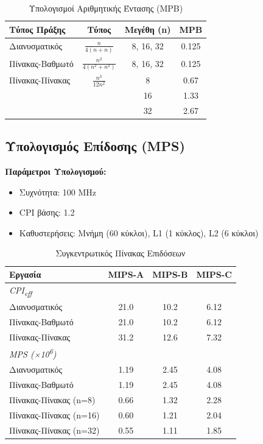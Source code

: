 \documentclass[11pt,a4paper]{article}
\begin{document}
\begin{table}[H]
\centering
\begin{tabular}{|l|c|c|c|}
\hline
\textbf{Τύπος Πράξης} & \textbf{Τύπος} & \textbf{Μεγέθη (n)} & \textbf{MPB} \\
\hline
Διανυσματικός & $\frac{n}{4(n + n)}$ & 8, 16, 32 & 0.125 \\
\hline
Πίνακας-Βαθμωτό & $\frac{n^2}{4(n^2 + n^2)}$ & 8, 16, 32 & 0.125 \\
\hline
Πίνακας-Πίνακας & $\frac{n^3}{12n^2}$ & 8 & 0.67 \\
& & 16 & 1.33 \\
& & 32 & 2.67 \\
\hline
\end{tabular}
\caption{Υπολογισμοί Αριθμητικής Έντασης (MPB)}
\label{tab:mpb-calcs}
\end{table}

\subsection{Υπολογισμός Επίδοσης (MPS)}

\textbf{Παράμετροι Υπολογισμού:}
\begin{itemize}
\item Συχνότητα: 100 MHz
\item CPI βάσης: 1.2
\item Καθυστερήσεις: Μνήμη (60 κύκλοι), L1 (1 κύκλος), L2 (6 κύκλοι)
\end{itemize}

\begin{table}[H]
\centering
\begin{tabular}{|l|c|c|c|}
\hline
\textbf{Εργασία} & \textbf{MIPS-A} & \textbf{MIPS-B} & \textbf{MIPS-C} \\
\hline
\multicolumn{4}{|l|}{\textit{CPI\textsubscript{eff}}} \\
\hline
Διανυσματικός & 21.0 & 10.2 & 6.12 \\
Πίνακας-Βαθμωτό & 21.0 & 10.2 & 6.12 \\
Πίνακας-Πίνακας & 31.2 & 12.6 & 7.32 \\
\hline
\multicolumn{4}{|l|}{\textit{MPS (×10\textsuperscript{6})}} \\
\hline
Διανυσματικός & 1.19 & 2.45 & 4.08 \\
Πίνακας-Βαθμωτό & 1.19 & 2.45 & 4.08 \\
Πίνακας-Πίνακας (n=8) & 0.66 & 1.32 & 2.28 \\
Πίνακας-Πίνακας (n=16) & 0.60 & 1.21 & 2.04 \\
Πίνακας-Πίνακας (n=32) & 0.55 & 1.11 & 1.85 \\
\hline
\end{tabular}
\caption{Συγκεντρωτικός Πίνακας Επιδόσεων}
\label{tab:performance}
\end{table}
\end{document}
